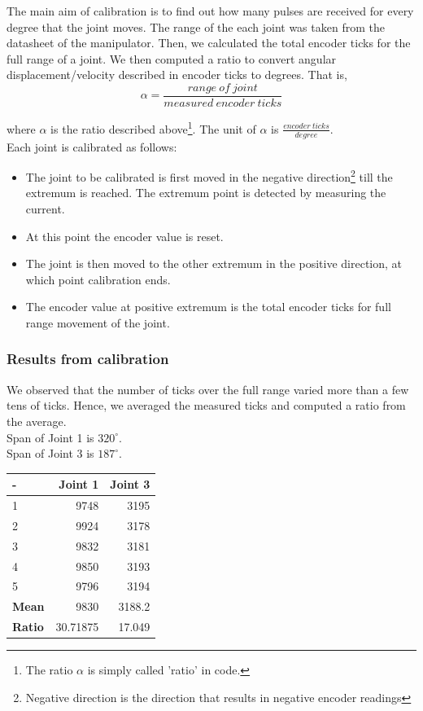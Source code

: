 \documentclass[10pt,a4paper]{article}
\begin{document}
The main aim of calibration is to find out how many pulses are
received for every degree that the joint moves. The range of the each
joint was taken from the datasheet of the manipulator. Then, we
calculated the total encoder ticks for the full range of a joint. We
then computed a ratio to convert angular displacement/velocity
described in encoder ticks to degrees. That is,
\[ \alpha = \frac{range\ of\ joint}{measured\ encoder\ ticks}\]

where \(\alpha\) is the ratio described above\footnote{The ratio
  \(\alpha\) is simply called 'ratio' in code.}. The unit of
\(\alpha\) is \( \frac{encoder\ ticks}{degree}\). \\


Each joint is calibrated as follows:
\begin{itemize}
\item The joint to be calibrated is first moved in the negative
  direction\footnote{Negative direction is the direction that results
    in negative encoder readings} till the extremum is reached. The
  extremum point is detected by measuring the current.
\item At this point the encoder value is reset. 
\item The joint is then moved to the other extremum in the positive
  direction, at which point calibration ends.
\item The encoder value at positive extremum is the total encoder
  ticks for full range movement of the joint.
\end{itemize}

\subsubsection{Results from calibration}

We observed that the number of ticks over the full range varied more
than a few tens of ticks. Hence, we averaged the measured ticks and
computed a ratio from the average. \\ 
Span of Joint 1 is \(320^{\circ}\).\\
Span of Joint 3 is \(187^{\circ}\).\\

\begin{tabular}{ | l | r | r |}
\hline
- & \textbf{Joint 1} & \textbf{Joint 3} \\
\hline
1 & 9748 & 3195 \\
\hline
2 & 9924 & 3178 \\
\hline
3 & 9832 & 3181 \\
\hline
4 & 9850 & 3193 \\
\hline
5 & 9796 & 3194 \\
\hline
\textbf{Mean} & 9830 & 3188.2 \\
\hline
\textbf{Ratio} & 30.71875 & 17.049 \\
\hline

\end{tabular}
\end{document}
